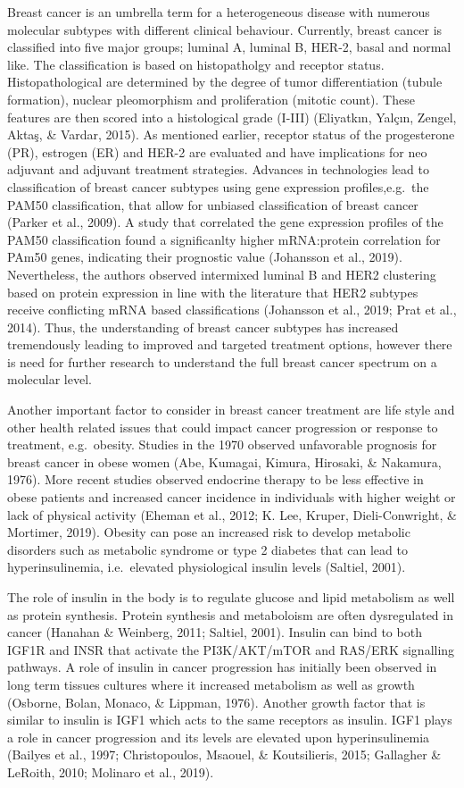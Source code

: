 \documentclass[
  12pt,
  openany]{book}
\begin{document}
Breast cancer is an umbrella term for a heterogeneous disease with numerous molecular subtypes with different clinical behaviour. Currently, breast cancer is classified into five major groups; luminal A, luminal B, HER-2, basal and normal like. The classification is based on histopatholgy and receptor status. Histopathological are determined by the degree of tumor differentiation (tubule formation), nuclear pleomorphism and proliferation (mitotic count). These features are then scored into a histological grade (I-III) (Eliyatkın, Yalçın, Zengel, Aktaş, \& Vardar, 2015). As mentioned earlier, receptor status of the progesterone (PR), estrogen (ER) and HER-2 are evaluated and have implications for neo adjuvant and adjuvant treatment strategies. Advances in technologies lead to classification of breast cancer subtypes using gene expression profiles,e.g.~the PAM50 classification, that allow for unbiased classification of breast cancer (Parker et al., 2009). A study that correlated the gene expression profiles of the PAM50 classification found a significanlty higher mRNA:protein correlation for PAm50 genes, indicating their prognostic value (Johansson et al., 2019). Nevertheless, the authors observed intermixed luminal B and HER2 clustering based on protein expression in line with the literature that HER2 subtypes receive conflicting mRNA based classifications (Johansson et al., 2019; Prat et al., 2014). Thus, the understanding of breast cancer subtypes has increased tremendously leading to improved and targeted treatment options, however there is need for further research to understand the full breast cancer spectrum on a molecular level.

Another important factor to consider in breast cancer treatment are life style and other health related issues that could impact cancer progression or response to treatment, e.g.~obesity. Studies in the 1970 observed unfavorable prognosis for breast cancer in obese women (Abe, Kumagai, Kimura, Hirosaki, \& Nakamura, 1976). More recent studies observed endocrine therapy to be less effective in obese patients and increased cancer incidence in individuals with higher weight or lack of physical activity (Eheman et al., 2012; K. Lee, Kruper, Dieli-Conwright, \& Mortimer, 2019). Obesity can pose an increased risk to develop metabolic disorders such as metabolic syndrome or type 2 diabetes that can lead to hyperinsulinemia, i.e.~elevated physiological insulin levels (Saltiel, 2001).

The role of insulin in the body is to regulate glucose and lipid metabolism as well as protein synthesis. Protein synthesis and metaboloism are often dysregulated in cancer (Hanahan \& Weinberg, 2011; Saltiel, 2001). Insulin can bind to both IGF1R and INSR that activate the PI3K/AKT/mTOR and RAS/ERK signalling pathways. A role of insulin in cancer progression has initially been observed in long term tissues cultures where it increased metabolism as well as growth (Osborne, Bolan, Monaco, \& Lippman, 1976). Another growth factor that is similar to insulin is IGF1 which acts to the same receptors as insulin. IGF1 plays a role in cancer progression and its levels are elevated upon hyperinsulinemia (Bailyes et al., 1997; Christopoulos, Msaouel, \& Koutsilieris, 2015; Gallagher \& LeRoith, 2010; Molinaro et al., 2019).
\end{document}
